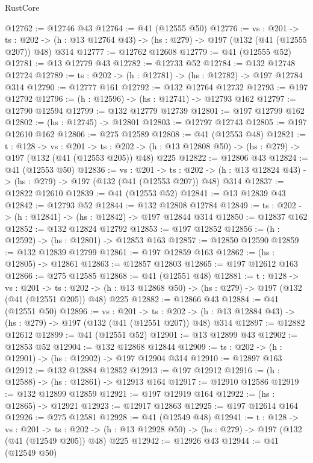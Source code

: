 \begin{lexlean}{RustCore}
\begin{coremodule}
@12762 := @12746 @43
@12764 := @41 (@12555 @50)
@12776 := {vs : @201} ->
  {ts : @202} -> (h : @13 @12764 @43) -> (hs : @279) -> @197 (@132 (@41 (@12555 @207)) @48) @314
@12777 := @12762 @12608
@12779 := @41 (@12555 @52)
@12781 := @13 @12779 @43
@12782 := @12733 @52
@12784 := @132 @12748 @12724
@12789 := {ts : @202} -> (h : @12781) -> (hs : @12782) -> @197 @12784 @314
@12790 := @12777 @161
@12792 := @132 @12764 @12732
@12793 := @197 @12792
@12796 := (h : @12596) -> (hs : @12741) -> @12793 @162
@12797 := @12790 @12594
@12799 := @132 @12779 @12739
@12801 := @197 @12799 @162
@12802 := (hs : @12745) -> @12801
@12803 := @12797 @12743
@12805 := @197 @12610 @162
@12806 := @275 @12589
@12808 := @41 (@12553 @48)
@12821 := {t : @128} ->
  {vs : @201} ->
  {ts : @202} -> (h : @13 @12808 @50) -> (hs : @279) -> @197 (@132 (@41 (@12553 @205)) @48) @225
@12822 := @12806 @43
@12824 := @41 (@12553 @50)
@12836 := {vs : @201} ->
  {ts : @202} -> (h : @13 @12824 @43) -> (hs : @279) -> @197 (@132 (@41 (@12553 @207)) @48) @314
@12837 := @12822 @12610
@12839 := @41 (@12553 @52)
@12841 := @13 @12839 @43
@12842 := @12793 @52
@12844 := @132 @12808 @12784
@12849 := {ts : @202} -> (h : @12841) -> (hs : @12842) -> @197 @12844 @314
@12850 := @12837 @162
@12852 := @132 @12824 @12792
@12853 := @197 @12852
@12856 := (h : @12592) -> (hs : @12801) -> @12853 @163
@12857 := @12850 @12590
@12859 := @132 @12839 @12799
@12861 := @197 @12859 @163
@12862 := (hs : @12805) -> @12861
@12863 := @12857 @12803
@12865 := @197 @12612 @163
@12866 := @275 @12585
@12868 := @41 (@12551 @48)
@12881 := {t : @128} ->
  {vs : @201} ->
  {ts : @202} -> (h : @13 @12868 @50) -> (hs : @279) -> @197 (@132 (@41 (@12551 @205)) @48) @225
@12882 := @12866 @43
@12884 := @41 (@12551 @50)
@12896 := {vs : @201} ->
  {ts : @202} -> (h : @13 @12884 @43) -> (hs : @279) -> @197 (@132 (@41 (@12551 @207)) @48) @314
@12897 := @12882 @12612
@12899 := @41 (@12551 @52)
@12901 := @13 @12899 @43
@12902 := @12853 @52
@12904 := @132 @12868 @12844
@12909 := {ts : @202} -> (h : @12901) -> (hs : @12902) -> @197 @12904 @314
@12910 := @12897 @163
@12912 := @132 @12884 @12852
@12913 := @197 @12912
@12916 := (h : @12588) -> (hs : @12861) -> @12913 @164
@12917 := @12910 @12586
@12919 := @132 @12899 @12859
@12921 := @197 @12919 @164
@12922 := (hs : @12865) -> @12921
@12923 := @12917 @12863
@12925 := @197 @12614 @164
@12926 := @275 @12581
@12928 := @41 (@12549 @48)
@12941 := {t : @128} ->
  {vs : @201} ->
  {ts : @202} -> (h : @13 @12928 @50) -> (hs : @279) -> @197 (@132 (@41 (@12549 @205)) @48) @225
@12942 := @12926 @43
@12944 := @41 (@12549 @50)

\end{coremodule}
\end{lexlean}
